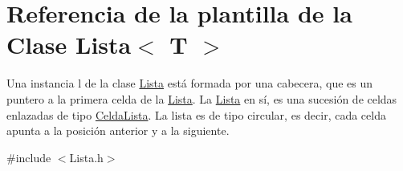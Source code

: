 \hypertarget{classLista}{}\section{Referencia de la plantilla de la Clase Lista$<$ T $>$}
\label{classLista}


Una instancia l de la clase \mbox{\hyperlink{classLista}{Lista}} está formada por una cabecera, que es un puntero a la primera celda de la \mbox{\hyperlink{classLista}{Lista}}. La \mbox{\hyperlink{classLista}{Lista}} en sí, es una sucesión de celdas enlazadas de tipo \mbox{\hyperlink{structCeldaLista}{Celda\+Lista}}. La lista es de tipo circular, es decir, cada celda apunta a la posición anterior y a la siguiente.  




{\ttfamily \#include $<$Lista.\+h$>$}

